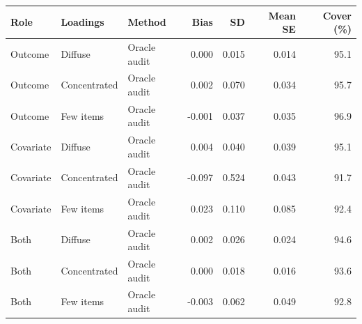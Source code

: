 \begin{tabular}{lllrrrr}
\toprule
Role & Loadings & Method & Bias & SD & Mean SE & Cover (\%) \\
\midrule
Outcome & Diffuse & Oracle audit & 0.000 & 0.015 & 0.014 & 95.1 \\
Outcome & Concentrated & Oracle audit & 0.002 & 0.070 & 0.034 & 95.7 \\
Outcome & Few items & Oracle audit & -0.001 & 0.037 & 0.035 & 96.9 \\
Covariate & Diffuse & Oracle audit & 0.004 & 0.040 & 0.039 & 95.1 \\
Covariate & Concentrated & Oracle audit & -0.097 & 0.524 & 0.043 & 91.7 \\
Covariate & Few items & Oracle audit & 0.023 & 0.110 & 0.085 & 92.4 \\
Both & Diffuse & Oracle audit & 0.002 & 0.026 & 0.024 & 94.6 \\
Both & Concentrated & Oracle audit & 0.000 & 0.018 & 0.016 & 93.6 \\
Both & Few items & Oracle audit & -0.003 & 0.062 & 0.049 & 92.8 \\
\bottomrule
\end{tabular}
